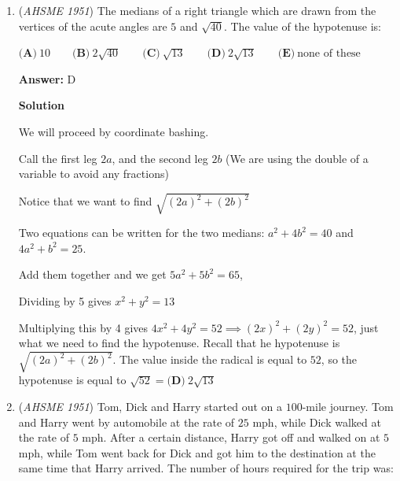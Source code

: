 \begin{enumerate}
 \textbf{Answer: }C



\textbf{Solution}

Let the radius of the circle be $r$. Let $s_1$ be the side length of the square inscribed in the semicircle and $s_2$ be the side length of the square inscribed in the entire circle. For the square in the semicircle, we have $s_1^2 + (\frac{s_1}{2})^2 = r^2 \Rightarrow s_1^2 = \frac{4}{5}r^2$. For the square in the circle, we have $s_2 \sqrt{2} = 2r \Rightarrow s_2^2 = 2r^2$.

 Therefore, $s_1^2 : s_2^2 = \frac{4}{5}r^2 : 2r^2 = \boxed{\textbf{(C)}\ 2: 5}$



	\item (\textit{AHSME 1951}) The medians of a right triangle which are drawn from the vertices of the acute angles are $5$ and $\sqrt{40}$. The value of the hypotenuse is:


 $\textbf{(A)}\ 10\qquad\textbf{(B)}\ 2\sqrt{40}\qquad\textbf{(C)}\ \sqrt{13}\qquad\textbf{(D)}\ 2\sqrt{13}\qquad\textbf{(E)}\ \text{none of these}$

 \textbf{Answer: }D



\textbf{Solution}

We will proceed by coordinate bashing.

 Call the first leg $2a$, and the second leg $2b$ (We are using the double of a variable to avoid any fractions)

 Notice that we want to find $\sqrt{(2a)^2+(2b)^2}$

 Two equations can be written for the two medians: $a^2 + 4b^2 = 40$ and $4a^2+b^2= 25$. 

 Add them together and we get $5a^2+5b^2=65$,

 Dividing by 5 gives $x^2+y^2=13$ 

 Multiplying this by 4 gives $4x^2+4y^2=52\implies (2x)^2+(2y)^2=52$, just what we need to find the hypotenuse. Recall that he hypotenuse is $\sqrt{(2a)^2+(2b)^2}$. The value inside the radical is equal to $52$, so the hypotenuse is equal to $\sqrt{52}=\boxed{\textbf{(D)}\ 2\sqrt{13}}$



	\item (\textit{AHSME 1951}) Tom, Dick and Harry started out on a $100$-mile journey. Tom and Harry went by automobile at the rate of $25$ mph, while Dick walked at the rate of $5$ mph. After a certain distance, Harry got off and walked on at $5$ mph, while Tom went back for Dick and got him to the destination at the same time that Harry arrived. The number of hours required for the trip was: 



\end{enumerate}

